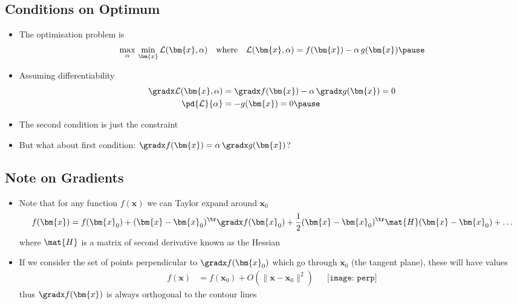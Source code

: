 \begin{slide}
\section[-2]{Conditions on Optimum}

\begin{PauseHighLight}
  \begin{itemize}
  \item The optimisation problem is
    \begin{align*}
      \max_{\alpha} \, \min_{\bm{x}} \mathcal{L}(\bm{x},\alpha)
      \quad \mbox{where} \quad \mathcal{L}(\bm{x},\alpha) = f(\bm{x}) - \alpha\,
      g(\bm{x}) \pause
    \end{align*}
  \item Assuming differentiability
    \begin{align*}
      \gradx \mathcal{L}(\bm{x},\alpha) &= \gradx f(\bm{x}) - \alpha\,\gradx g(\bm{x}) =0\\
      \pd{\mathcal{L}}{\alpha} &=  -g(\bm{x}) =0\pause
    \end{align*}
  \item The second condition is just the constraint\pause
  \item But what about first condition: $\gradx f(\bm{x}) = \alpha\,\gradx g(\bm{x})$?\pauseb
  \end{itemize}
\end{PauseHighLight}

\end{slide}



\begin{slide}
\section{Note on Gradients}

\begin{PauseHighLight}
  \begin{itemize}
  \item Note that for any function $f(\bm{x})$ we can Taylor expand
    around $\bm{x}_0$
    \begin{align*}
      f(\bm{x}) = f(\bm{x}_0) + (\bm{x}-\bm{x}_0)^\tr \gradx f(\bm{x}_0) + 
      \frac{1}{2}(\bm{x}-\bm{x}_0)^\tr \mat{H} (\bm{x}-\bm{x}_0) + \ldots
    \end{align*}
    where $\mat{H}$ is a matrix of second derivative known as the
    Hessian\pause
  \item If we consider the set of points perpendicular to $\gradx f(\bm{x}_0)$ which
    go through $\bm{x}_0$ (the tangent plane), these will have values
    \begin{align*}
      f(\bm{x}) &= f(\bm{x}_0) + O(\|\bm{x}-\bm{x}_0\|^2) & &
      \texttt{[image: perp]}
    \end{align*}
    thus $\gradx f(\bm{x})$ is always orthogonal to the contour lines\pause
  \end{itemize}
\end{PauseHighLight}

\end{slide}


